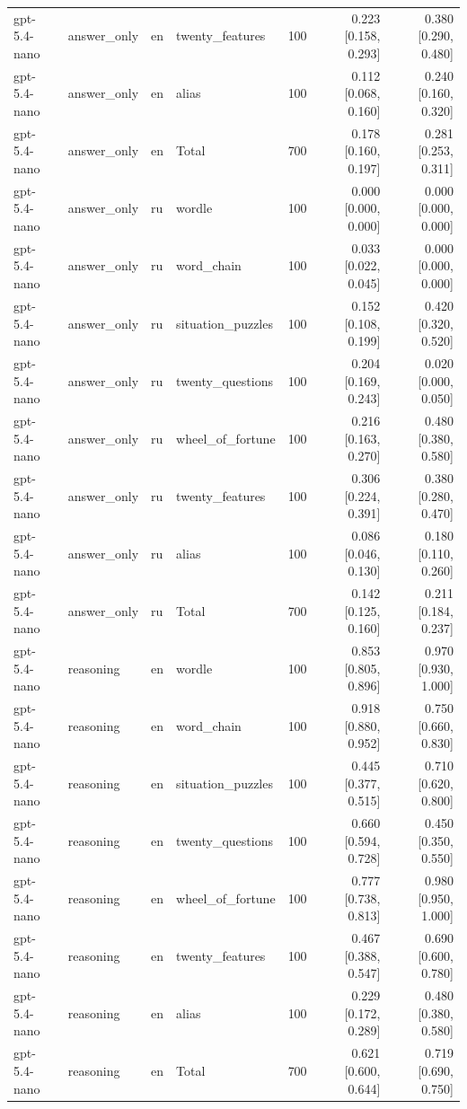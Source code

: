\begin{longtable}{llllrrr}
gpt-5.4-nano & answer\_only & en & twenty\_features & 100 & 0.223 [0.158, 0.293] & 0.380 [0.290, 0.480] \\
gpt-5.4-nano & answer\_only & en & alias & 100 & 0.112 [0.068, 0.160] & 0.240 [0.160, 0.320] \\
gpt-5.4-nano & answer\_only & en & Total & 700 & 0.178 [0.160, 0.197] & 0.281 [0.253, 0.311] \\
gpt-5.4-nano & answer\_only & ru & wordle & 100 & 0.000 [0.000, 0.000] & 0.000 [0.000, 0.000] \\
gpt-5.4-nano & answer\_only & ru & word\_chain & 100 & 0.033 [0.022, 0.045] & 0.000 [0.000, 0.000] \\
gpt-5.4-nano & answer\_only & ru & situation\_puzzles & 100 & 0.152 [0.108, 0.199] & 0.420 [0.320, 0.520] \\
gpt-5.4-nano & answer\_only & ru & twenty\_questions & 100 & 0.204 [0.169, 0.243] & 0.020 [0.000, 0.050] \\
gpt-5.4-nano & answer\_only & ru & wheel\_of\_fortune & 100 & 0.216 [0.163, 0.270] & 0.480 [0.380, 0.580] \\
gpt-5.4-nano & answer\_only & ru & twenty\_features & 100 & 0.306 [0.224, 0.391] & 0.380 [0.280, 0.470] \\
gpt-5.4-nano & answer\_only & ru & alias & 100 & 0.086 [0.046, 0.130] & 0.180 [0.110, 0.260] \\
gpt-5.4-nano & answer\_only & ru & Total & 700 & 0.142 [0.125, 0.160] & 0.211 [0.184, 0.237] \\
gpt-5.4-nano & reasoning & en & wordle & 100 & 0.853 [0.805, 0.896] & 0.970 [0.930, 1.000] \\
gpt-5.4-nano & reasoning & en & word\_chain & 100 & 0.918 [0.880, 0.952] & 0.750 [0.660, 0.830] \\
gpt-5.4-nano & reasoning & en & situation\_puzzles & 100 & 0.445 [0.377, 0.515] & 0.710 [0.620, 0.800] \\
gpt-5.4-nano & reasoning & en & twenty\_questions & 100 & 0.660 [0.594, 0.728] & 0.450 [0.350, 0.550] \\
gpt-5.4-nano & reasoning & en & wheel\_of\_fortune & 100 & 0.777 [0.738, 0.813] & 0.980 [0.950, 1.000] \\
gpt-5.4-nano & reasoning & en & twenty\_features & 100 & 0.467 [0.388, 0.547] & 0.690 [0.600, 0.780] \\
gpt-5.4-nano & reasoning & en & alias & 100 & 0.229 [0.172, 0.289] & 0.480 [0.380, 0.580] \\
gpt-5.4-nano & reasoning & en & Total & 700 & 0.621 [0.600, 0.644] & 0.719 [0.690, 0.750] \\

\end{longtable}
